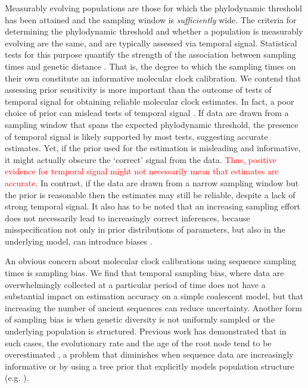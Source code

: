 \documentclass[11pt]{article}
\begin{document}
Measurably evolving populations are those for which the phylodynamic threshold has been attained and the sampling window is \textit{sufficiently} wide. The criteria for determining the phylodynamic threshold and whether a population is measurably evolving are the same, and are typically assessed via temporal signal. Statistical tests for this purpose quantify the strength of the association between sampling times and genetic distance \citep{rieux2016inferences, duchene2015performance, murray2016effect, featherstone2024clockor2, rambaut2016exploring}. That is, the degree to which the sampling times on their own constitute an informative molecular clock calibration. We contend that assessing prior sensitivity is more important than the outcome of tests of temporal signal for obtaining reliable molecular clock estimates. In fact, a poor choice of prior can mislead tests of temporal signal \citep{tay2024assessing}. If data are drawn from a sampling window that spans the expected phylodynamic threshold, the presence of temporal signal is likely supported by most tests, suggesting accurate estimates. Yet, if the prior used for the estimation is misleading and informative, it might actually obscure the `correct' signal from the data. \textcolor{red}{Thus, positive evidence for temporal signal might not necessarily mean that estimates are accurate}. In contrast, if the data are drawn from a narrow sampling window but the prior is reasonable then the estimates may still be reliable, despite a lack of strong temporal signal. It also has to be noted that an increasing sampling effort does not necessarily lead to increasingly correct inferences, because misspecification not only in prior distributions of parameters, but also in the underlying model, can introduce biases \citep{ferretti2024biased, moller2018impact}.

An obvious concern about molecular clock calibrations using sequence sampling times is sampling bias. We find that temporal sampling bias, where data are overwhelmingly collected at a particular period of time does not have a substantial impact on estimation accuracy on a simple coalescent model, but that increasing the number of ancient sequences can reduce uncertainty. Another form of sampling bias is when genetic diversity is not uniformly sampled or the underlying population is structured. Previous work has demonstrated that in such cases, the evolutionary rate and the age of the root node tend to be overestimated \citep{moller2018impact}, a problem that diminishes when sequence data are increasingly informative or by using a tree prior that explicitly models population structure (e.g. \citealt{kuhnert2016phylodynamics, muller2017structured}). 
\end{document}
